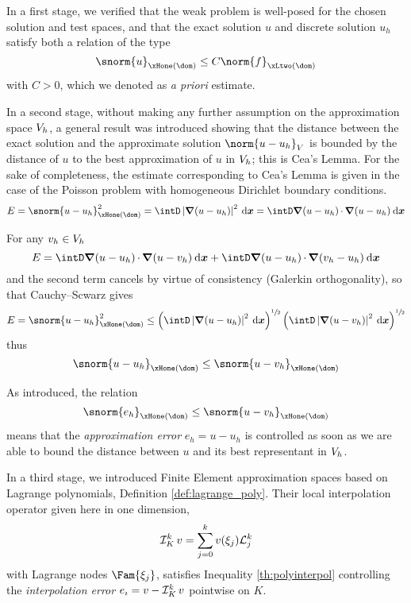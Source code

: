 \medskip
In a first stage, we verified that the weak problem is well-posed for the chosen solution and test spaces, and that the exact solution $u$ and discrete solution $u_h$ satisfy both a relation of the type
\begin{equation*}
\snorm{u}_{\xHone(\dom)} \leq C \norm{f}_{\xLtwo(\dom)}
\end{equation*}
with $C > 0$, which we denoted as \textit{a priori} estimate.

\medskip
In a second stage, without making any further assumption on the approximation space ${{V}}_h$, a general result was introduced showing that the distance between the exact solution and the approximate solution $\norm{u - u_h}_{\xV}$ is bounded by the distance of $u$ to the best approximation of $u$ in ${{V}}_h$; this is Cea's Lemma.
For the sake of completeness, the estimate corresponding to Cea's Lemma is given in the case of the Poisson problem with homogeneous Dirichlet boundary conditions.
\begin{equation*}
E = \snorm{u - u_h}^2_{\xHone(\dom)} = \intD \Abs{\Grad(u - u_h)}^2\dxx = \intD \Grad(u - u_h)\xDot\Grad(u - u_h) \dxx
\end{equation*}

For any $v_h\in{{V}}_h$
\begin{equation*}
E = \intD \Grad(u - u_h)\xDot\Grad(u - v_h) \dxx + \intD \Grad(u - u_h)\xDot\Grad(v_h - u_h) \dxx
\end{equation*}
and the second term cancels by virtue of consistency (Galerkin orthogonality), so that Cauchy--Scwarz gives
\begin{equation*}
E = \snorm{u - u_h}^2_{\xHone(\dom)} \leq \left(\intD \Abs{\Grad(u - u_h)}^2 \dxx\right)^{\sfrac{1}{2}} \left(\intD \Abs{\Grad(u - v_h)}^2 \dxx\right)^{\sfrac{1}{2}}
\end{equation*}
thus
\begin{equation*}
\snorm{u - u_h}_{\xHone(\dom)} \leq \snorm{u - v_h}_{\xHone(\dom)}
\end{equation*}


As introduced, the relation
\begin{equation}\label{eq:error_estimate_h1}
\snorm{e_h}_{\xHone(\dom)} \leq \snorm{u - v_h}_{\xHone(\dom)}
\end{equation}
means that the \textit{approximation error} $e_h = u - u_h$ is controlled as soon as we are able to bound the distance between $u$ and its best representant in ${{V}}_h$.

\medskip
In a third stage, we introduced Finite Element approximation spaces based on Lagrange polynomials, Definition \ref{def:lagrange_poly}.
Their local interpolation operator given here in one dimension,
\begin{equation*}
\mathop{\mathcal{I}_{K}^{k}} v = \sum_{j=0}^k v(\xi_j) \mathcal L^{k}_{j}
\end{equation*}
with Lagrange nodes $\Fam{\xi_j}$, satisfies Inequality \eqref{th:polyinterpol} controlling the \textit{interpolation error} $e_\imath = v - \mathop{\mathcal{I}_{K}^{k}} v$ pointwise on $K$.

